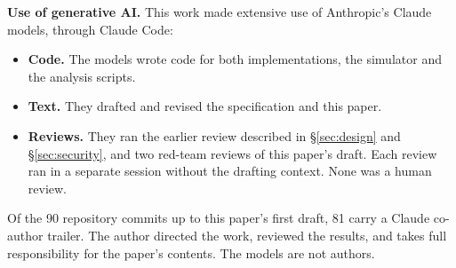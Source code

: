 \documentclass[sigconf,nonacm]{acmart}
\begin{document}
\maketitle













\begin{acks}
\textbf{Use of generative AI.} This work made extensive use of
Anthropic's Claude models, through Claude Code:
\begin{itemize}
\item \textbf{Code.} The models wrote code for both implementations, the
  simulator and the analysis scripts.
\item \textbf{Text.} They drafted and revised the specification and this
  paper.
\item \textbf{Reviews.} They ran the earlier review described in
  \S\ref{sec:design} and \S\ref{sec:security}, and two red-team reviews
  of this paper's draft. Each review ran in a separate session without
  the drafting context. None was a human review.
\end{itemize}
Of the 90 repository commits up to this paper's first draft, 81 carry a
Claude co-author trailer. The author directed the work, reviewed the
results, and takes full responsibility for the paper's contents. The
models are not authors.
\end{acks}




\appendix

\end{document}
